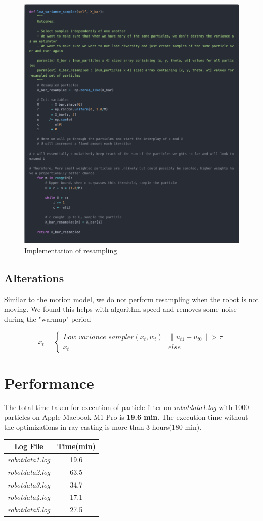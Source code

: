 \documentclass[12pt, a4paper]{article}
\begin{document}
\begin{figure}[H]
  \centering
  \includegraphics[width=0.9\linewidth]{results/resampling_2.png}
  \caption{Implementation of resampling}
\end{figure}
\subsection{Alterations}
Similar to the motion model, we do not perform resampling when the robot is not moving. We found this helps with algorithm speed and removes some noise during the "warmup" period

\[ 
x_{t} = \left\{
\begin{array}{ll}
    Low\_variance\_sampler(x_{t}, w_{t}) & \lVert u_{t1} - u_{t0} \rVert > \tau \\
    x_{t} & else
\end{array} 
\right. 
\]

\section{Performance}
The total time taken for execution of particle filter on \textit{robotdata1.log} with 1000 particles on Apple Macbook M1 Pro is \textbf{19.6 min}. The execution time without the optimizations in ray casting is more than 3 hours(180 min).
\begin{center}
  \begin{tabular}{|c|c|}
    \hline
    \textbf{Log File} & \textbf{Time(min)} \\
    \hline
    \textit{robotdata1.log} & 19.6 \\
    \hline
    \textit{robotdata2.log} &  63.5\\
    \hline
    \textit{robotdata3.log} &  34.7\\
    \hline
    \textit{robotdata4.log} &  17.1\\
    \hline
    \textit{robotdata5.log} &  27.5\\
    \hline
  \end{tabular}
\end{center}
\end{document}
